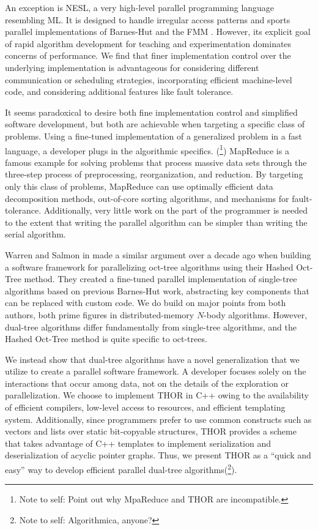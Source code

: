 \documentclass[twoside,leqno,twocolumn]{article}
\newcommand{\authornote}[1]{(\footnote{Note to self: #1})}
\newcommand{\authorsnote}[1]{\authornote{#1}}
\begin{document}
An exception is NESL, a very high-level parallel programming language resembling ML.
It is designed to handle irregular access patterns and sports parallel implementations of Barnes-Hut and the FMM \cite{blelloch_nbody}.
However, its explicit goal of rapid algorithm development for teaching and experimentation dominates concerns of performance.
We find that finer implementation control over the underlying implementation is advantageous for considering different communication or scheduling strategies, incorporating efficient machine-level code, and considering additional features like fault tolerance.

It seems paradoxical to desire both fine implementation control and simplified software development, but both are achievable when targeting a specific class of problems.
Using a fine-tuned implementation of a generalized problem in a fast language, a developer plugs in the algorithmic specifics.
\authorsnote{Point out why MpaReduce and THOR are incompatible.}
MapReduce \cite{mapreduce} is a famous example for solving problems that process massive data sets through the three-step process of preprocessing, reorganization, and reduction.
By targeting only this class of problems, MapReduce can use optimally efficient data decomposition methods, out-of-core sorting algorithms, and mechanisms for fault-tolerance.
Additionally, very little work on the part of the programmer is needed to the extent that writing the parallel algorithm can be simpler than writing the serial algorithm.

Warren and Salmon in \cite{warren95portable} made a similar argument over a decade ago when building a software framework for parallelizing oct-tree algorithms using their Hashed Oct-Tree method.
They created a fine-tuned parallel implementation of single-tree algorithms based on previous Barnes-Hut work, abstracting key components that can be replaced with custom code.
We do build on major points from both authors, both prime figures in distributed-memory $N$-body algorithms.
However, dual-tree algorithms differ fundamentally from single-tree algorithms, and the Hashed Oct-Tree method is quite specific to oct-trees.

We instead show that dual-tree algorithms have a novel generalization that we utilize to create a parallel software framework.
A developer focuses solely on the interactions that occur among data, not on the details of the exploration or parallelization.
We choose to implement THOR in C++ owing to the availability of efficient compilers, low-level access to resources, and efficient templating system.
Additionally, since programmers prefer to use common constructs such as vectors and lists over static bit-copyable structures, THOR provides a scheme that takes advantage of C++ templates to implement serialization and deserialization of acyclic pointer graphs.
Thus, we present THOR as a ``quick and easy'' way to develop efficient parallel dual-tree algorithms\authorsnote{Algorithmica, anyone?}.
\end{document}
